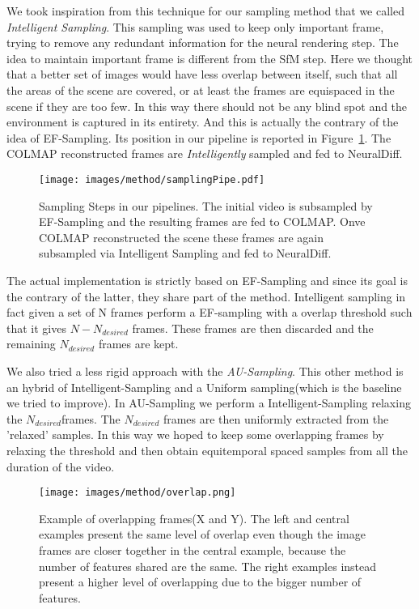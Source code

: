 We took inspiration from this technique for our sampling method that we called \textit{Intelligent Sampling}. This sampling was 
used to keep only important frame, trying to remove any redundant information for the neural rendering step. The idea to maintain 
important frame is different from the SfM step. Here we thought that a better set of images would have less overlap between itself,
such that all the areas of the scene are covered, or at least the frames are equispaced in the scene if they are too few. In this way there should not
be any blind spot and the environment is captured in its entirety. And this is actually the contrary of the idea of EF-Sampling.
Its position in our pipeline is reported in Figure~\ref{fig:samplPipe}. The COLMAP reconstructed frames are \textit{Intelligently} sampled and fed to NeuralDiff.
\begin{figure}[t]
    \centering
    \texttt{[image: images/method/samplingPipe.pdf]} 
    \caption{Sampling Steps in our pipelines. The initial video is subsampled by
    EF-Sampling and the resulting frames are fed to COLMAP. Onve COLMAP reconstructed the scene 
    these frames are again subsampled via Intelligent Sampling and fed to NeuralDiff.}\label{fig:samplPipe}
\end{figure}

The actual implementation is strictly based on EF-Sampling and since its goal is the contrary of the latter, they share part of the method.
Intelligent sampling in fact given a set of N frames perform a EF-sampling with a overlap threshold such that it gives $ N-N_{desired}$ frames.
These frames are then discarded and the remaining $N_{desired}$ frames are kept.

We also tried a less rigid approach with the \textit{AU-Sampling}. This other method is an hybrid of Intelligent-Sampling and a Uniform sampling(which
is the baseline we tried to improve). In AU-Sampling we perform a Intelligent-Sampling relaxing the $N_{desired}$frames. The $N_{desired}$ frames are then 
uniformly extracted from the 'relaxed' samples. In this way we hoped to keep some overlapping frames by relaxing the threshold and then obtain
equitemporal spaced samples from all the duration of the video. 

\begin{figure}[t]
    \centering
    \texttt{[image: images/method/overlap.png]} 
    \caption{Example of overlapping frames(X and Y). The left and central
    examples present the same level of overlap even though the image frames 
    are closer together in the central example, because the 
    number of features shared are the same. The right examples instead
    present a higher level of overlapping due to the bigger number of 
    features.}\label{fig:overlap}
\end{figure}
